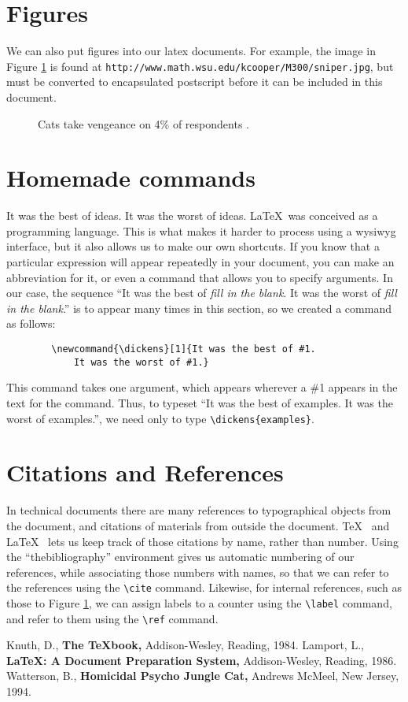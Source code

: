 \documentclass[UTF8]{article}
\begin{document}
	\section{Figures}
	We can also put figures into our latex documents.  For example, the
	image in Figure \ref{sniper} is found at 
	{\tt http://www.math.wsu.edu/kcooper/M300/sniper.jpg}, but must
	be converted to encapsulated postscript before it can be included
	in this document.
	\begin{figure}[ht]
		\begin{center}
			\caption{\label{sniper}
				Cats take vengeance on 4\% of respondents \cite{calvin}.}
			\vfill
		\end{center}
	\end{figure}
	
	\section{Homemade commands}
	\newcommand{\dickens}[1]{It was the best of #1. It was the worst of #1.}
	\dickens{ideas}
	\LaTeX\ was conceived as a programming language.  This is what makes it
	harder to process using a wysiwyg interface, but it also allows
	us to make our own shortcuts.
	If you know that a particular expression will appear repeatedly
	in your document, you can make an abbreviation for it, or even
	a command that allows you to specify arguments.  In our case,
	the sequence ``\dickens{{\it fill in the blank}}''
	is to appear many times in this section, so we created a command
	as follows:
	\begin{verbatim}
		\newcommand{\dickens}[1]{It was the best of #1. 
			It was the worst of #1.}
	\end{verbatim}
	This command takes one argument, which appears wherever a \#1 appears
	in the text for the command.  Thus, to typeset ``\dickens{examples}'',
	we need only to type \verb(\dickens{examples}(.
	
	\section{Citations and References}
	In technical documents there are many references to 
	typographical objects from the document, and citations
	of materials from outside the document.  \TeX\ \cite{knuth}
	and \LaTeX\ \cite{lamport} lets us keep track of those citations
	by name, rather than number.  Using the ``thebibliography'' 
	environment gives us automatic numbering of our references,
	while associating those numbers with names, so that we can
	refer to the references using the \verb(\cite( command.
	Likewise, for internal references, such as those to Figure \ref{sniper},
	we can assign labels to a counter using the \verb(\label(
	command, and refer to them using the \verb(\ref( command.
	
	\begin{thebibliography}{X}
		 Knuth, D., {\bf The \TeX book,} Addison-Wesley, Reading, 1984.
		 Lamport, L., {\bf \LaTeX: A Document Preparation System,}
		Addison-Wesley, Reading, 1986.
		 Watterson, B., {\bf Homicidal Psycho Jungle Cat,}
		Andrews McMeel, New Jersey, 1994.
	\end{thebibliography}
\end{document}
